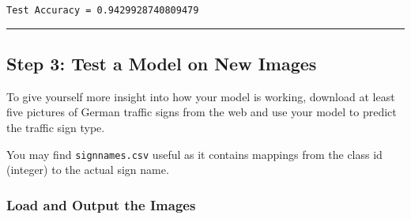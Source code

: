 \documentclass[11pt]{article}
\begin{document}
    \begin{Verbatim}[commandchars=\\\{\}]
Test Accuracy = 0.9429928740809479

    \end{Verbatim}

    \begin{center}\rule{0.5\linewidth}{\linethickness}\end{center}

\hypertarget{step-3-test-a-model-on-new-images}{%
\subsection{Step 3: Test a Model on New
Images}\label{step-3-test-a-model-on-new-images}}

To give yourself more insight into how your model is working, download
at least five pictures of German traffic signs from the web and use your
model to predict the traffic sign type.

You may find \texttt{signnames.csv} useful as it contains mappings from
the class id (integer) to the actual sign name.

    \hypertarget{load-and-output-the-images}{%
\subsubsection{Load and Output the
Images}\label{load-and-output-the-images}}
\end{document}
